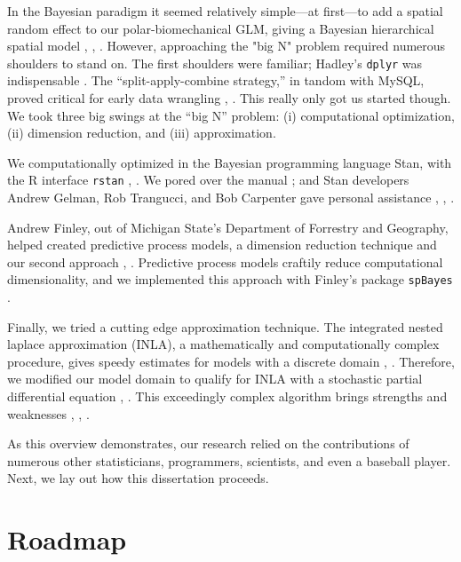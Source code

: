 In the Bayesian paradigm it seemed relatively simple---at first---to add a spatial random effect to our polar-biomechanical GLM, giving a Bayesian hierarchical spatial model \citep{Gelman2014}, \citep{Banerjee2014}, \citep{Oliver2005}. However, approaching the "big N" problem required numerous shoulders to stand on. The first shoulders were familiar; Hadley's \verb|dplyr| was indispensable \citep{Wickham2016}. The ``split-apply-combine strategy,'' in tandom with MySQL, proved critical for early data wrangling \citep{Wickham2016}, \citep{Tahaghoghi2006}. This really only got us started though. We took three big swings at the ``big N'' problem: (i) computational optimization, (ii) dimension reduction, and (iii) approximation.

We computationally optimized in the Bayesian programming language Stan, with the R interface \verb|rstan| \citep{rstan}, \citep{Gelman2015}. We pored over the manual \citep{STANtheMan}; and Stan developers Andrew Gelman, Rob Trangucci, and Bob Carpenter gave personal assistance \citep{Gelman}, \citep{Trangucci}, \citep{Carpenter}.

Andrew Finley, out of Michigan State's Department of Forrestry and Geography, helped created predictive process models, a dimension reduction technique and our second approach \citep{Banerjee2008}, \citep{Finley2012}. Predictive process models craftily reduce computational dimensionality, and we implemented this approach with Finley's package \verb|spBayes| \citep{Finley2013}.

Finally, we tried a cutting edge approximation technique. The integrated nested laplace approximation (INLA), a mathematically and computationally complex procedure, gives speedy estimates for models with a discrete domain \citep{Rue2009}, \citep{Rue2005}. Therefore, we modified our model domain to qualify for INLA with a stochastic partial differential equation \citep{Lindgren2011}, \citep{Lindstrom2016}. This exceedingly complex algorithm brings strengths and weaknesses \citep{Mondal2017}, \citep{Simpson2012b}, \citep{Rue2009}.

As this overview demonstrates, our research relied on the contributions of numerous other statisticians, programmers, scientists, and even a baseball player. Next, we lay out how this dissertation proceeds.

\section{Roadmap}

